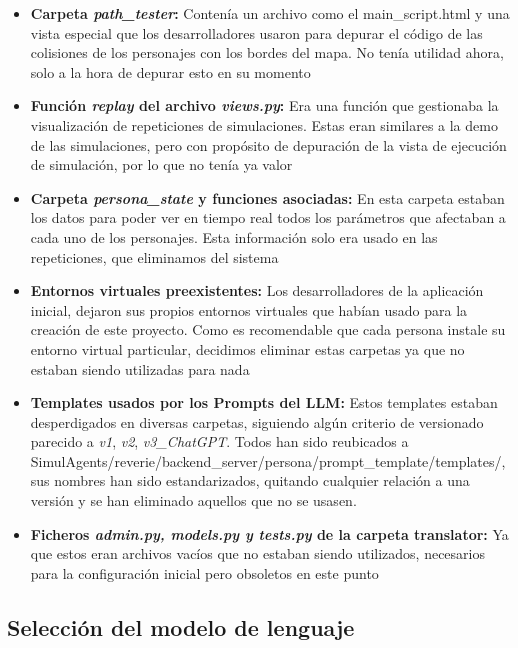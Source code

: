 \begin{itemize}
	\item \textbf{Carpeta \textit{path\_tester}:} Contenía un archivo como el main\_script.html y una vista especial que los desarrolladores usaron para depurar el código de las colisiones de los personajes con los bordes del mapa. No tenía utilidad ahora, solo a la hora de depurar esto en su momento
 
	\item \textbf{Función \textit{replay} del archivo \textit{views.py}:} Era una función que gestionaba la visualización de repeticiones de simulaciones. Estas eran similares a la demo de las simulaciones, pero con propósito de depuración de la vista de ejecución de simulación, por lo que no tenía ya valor
	
	\item \textbf{Carpeta \textit{persona\_state} y funciones asociadas:} En esta carpeta estaban los datos para poder ver en tiempo real todos los parámetros que afectaban a cada uno de los personajes. Esta información solo era usado en las repeticiones, que eliminamos del sistema
	
	\item \textbf{Entornos virtuales preexistentes:} Los desarrolladores de la aplicación inicial, dejaron sus propios entornos virtuales que habían usado para la creación de este proyecto. Como es recomendable que cada persona instale su entorno virtual particular, decidimos eliminar estas carpetas ya que no estaban siendo utilizadas para nada

    \item \textbf{Templates usados por los Prompts del LLM:} Estos templates estaban desperdigados en diversas carpetas, siguiendo algún criterio de versionado parecido a \textit{v1}, \textit{v2}, \textit{v3_ChatGPT}. Todos han sido reubicados a SimulAgents/reverie/backend\_server/persona/prompt\_template/templates/, sus nombres han sido estandarizados, quitando cualquier relación a una versión y se han eliminado aquellos que no se usasen.
	
	\item \textbf{Ficheros \textit{admin.py, models.py y tests.py} de la carpeta translator:} Ya que estos eran archivos vacíos que no estaban siendo utilizados,  necesarios para la configuración inicial pero obsoletos en este punto
	
\end{itemize}

\subsection{Selección del modelo de lenguaje}\label{subsec:Selección del modelo de lenguaje}

